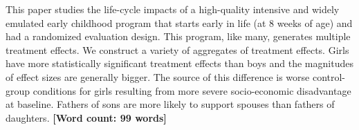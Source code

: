 \noindent This paper studies the life-cycle impacts of a high-quality intensive and widely emulated early childhood program that starts early in life (at 8 weeks of age) and had a randomized evaluation design. This program, like many, generates multiple treatment effects. We construct a variety of aggregates of treatment effects. Girls have more statistically significant treatment effects than boys and the magnitudes of effect sizes are generally bigger. The source of this difference is worse control-group conditions for girls resulting from more severe socio-economic disadvantage at baseline. Fathers of sons are more likely to support spouses than fathers of daughters. \textbf{[Word count: 99 words]}
